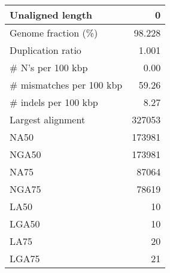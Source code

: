 \documentclass[12pt,a4paper]{article}
\begin{document}
\begin{table}[ht]
\begin{center}
\begin{tabular}{|l*{1}{|r}|}
Unaligned length & 0 \\ \hline
Genome fraction (\%) & 98.228 \\ \hline
Duplication ratio & 1.001 \\ \hline
\# N's per 100 kbp & 0.00 \\ \hline
\# mismatches per 100 kbp & 59.26 \\ \hline
\# indels per 100 kbp & 8.27 \\ \hline
Largest alignment & 327053 \\ \hline
NA50 & 173981 \\ \hline
NGA50 & 173981 \\ \hline
NA75 & 87064 \\ \hline
NGA75 & 78619 \\ \hline
LA50 & 10 \\ \hline
LGA50 & 10 \\ \hline
LA75 & 20 \\ \hline
LGA75 & 21 \\ \hline
\end{tabular}
\end{center}
\end{table}
\end{document}
